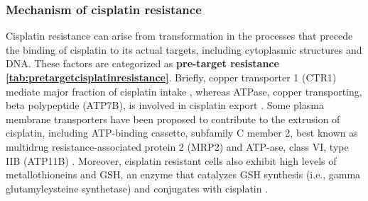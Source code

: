 \subsubsection{Mechanism of cisplatin resistance}
Cisplatin resistance can arise from transformation in the processes that precede the binding of cisplatin to its actual targets, including cytoplasmic structures and DNA. These factors are categorized as \textbf{pre-target resistance} \textbf{\autoref{tab:pretargetcisplatinresistance}}. Briefly, copper transporter 1 (CTR1) mediate major fraction of cisplatin intake \cite{more2010role,ishida2010enhancing, holzer2006contribution}, whereas ATPase, copper transporting, beta polypeptide (ATP7B), is involved in cisplatin export \cite{katano2002acquisition,komatsu2000copper, aida2005expression}. Some plasma membrane transporters have been proposed to contribute to the extrusion of cisplatin, including ATP-binding cassette, subfamily C member 2, best known as multidrug  resistance-associated protein 2 (MRP2) \cite {cui1999drug,korita2010multidrug,liedert2003overexpression} and ATP-ase, class VI, type IIB (ATP11B) \cite{moreno2013atp11b}. Moreover, cisplatin resistant cells also exhibit high levels of metallothioneins \cite{kelley1988overexpression,kasahara1991metallothionein} and GSH, an enzyme that catalyzes GSH synthesis (i.e., gamma glutamylcysteine synthetase) and conjugates with cisplatin \cite{lewis1988glutathione,chen2010role}. 


